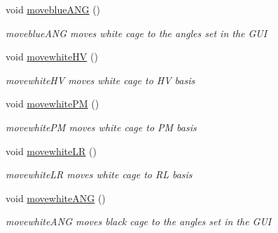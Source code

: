 \begin{DoxyCompactItemize}
\mbox{\label{classcagecontrol_ac6396cf94a2350fdf9c477e755a8c786}} 
void \hyperlink{classcagecontrol_ac6396cf94a2350fdf9c477e755a8c786}{moveblue\+A\+NG} ()
\begin{DoxyCompactList}\small\item\em moveblue\+A\+NG moves white cage to the angles set in the G\+UI \end{DoxyCompactList}\item 
\mbox{\label{classcagecontrol_a4ab679ff1453b8992b632185e753faf7}} 
void \hyperlink{classcagecontrol_a4ab679ff1453b8992b632185e753faf7}{movewhite\+HV} ()
\begin{DoxyCompactList}\small\item\em movewhite\+HV moves white cage to HV basis \end{DoxyCompactList}\item 
\mbox{\label{classcagecontrol_ac77a1ff1b29de6c0abff88d767ae4474}} 
void \hyperlink{classcagecontrol_ac77a1ff1b29de6c0abff88d767ae4474}{movewhite\+PM} ()
\begin{DoxyCompactList}\small\item\em movewhite\+PM moves white cage to PM basis \end{DoxyCompactList}\item 
\mbox{\label{classcagecontrol_a9c9eb314a6f9ab6679d29e2a9c86fe0a}} 
void \hyperlink{classcagecontrol_a9c9eb314a6f9ab6679d29e2a9c86fe0a}{movewhite\+LR} ()
\begin{DoxyCompactList}\small\item\em movewhite\+LR moves white cage to RL basis \end{DoxyCompactList}\item 
\mbox{\label{classcagecontrol_ae28a686ab880f2164b50872acf5a4c35}} 
void \hyperlink{classcagecontrol_ae28a686ab880f2164b50872acf5a4c35}{movewhite\+A\+NG} ()
\begin{DoxyCompactList}\small\item\em movewhite\+A\+NG moves black cage to the angles set in the G\+UI \end{DoxyCompactList}\item 
\mbox{\label{classcagecontrol_a432cbc27c9981b81c218163f26972daa}} 

\end{DoxyCompactItemize}
